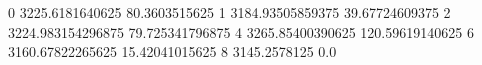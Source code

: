 0 3225.6181640625 80.3603515625
1 3184.93505859375 39.67724609375
2 3224.983154296875 79.725341796875
4 3265.85400390625 120.59619140625
6 3160.67822265625 15.42041015625
8 3145.2578125 0.0
